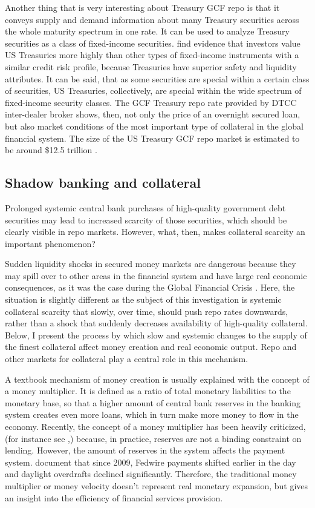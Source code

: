 \documentclass[11pt,a4paper,english,oneside]{article}
\begin{document}
Another thing that is very interesting about Treasury GCF repo is that it conveys supply and demand information about many Treasury securities across the whole maturity spectrum in one rate. It can be used to analyze Treasury securities as a class of fixed-income securities. \citet{krishnamurthy2012} find evidence that investors value US Treasuries more highly than other types of fixed-income instruments with a similar credit risk profile, because Treasuries have superior safety and liquidity attributes. It can be said, that as some securities are special within a certain class of securities, US Treasuries, collectively, are special within the wide spectrum of fixed-income security classes. The GCF Treasury repo rate provided by DTCC inter-dealer broker shows, then, not only the price of an overnight secured loan, but also market conditions of the most important type of collateral in the global financial system. The size of the US Treasury GCF repo market is estimated to be around \$12.5 trillion \citep{sifma2022}.

\subsection{Shadow banking and collateral}

Prolonged systemic central bank purchases of high-quality government debt securities may lead to increased scarcity of those securities, which should be clearly visible in repo markets. However, what, then, makes collateral scarcity an important phenomenon?

Sudden liquidity shocks in secured money markets are dangerous because they may spill over to other areas in the financial system and have large real economic consequences, as it was the case during the Global Financial Crisis \citep{gorton2009}. Here, the situation is slightly different as the subject of this investigation is systemic collateral scarcity that slowly, over time, should push repo rates downwards, rather than a shock that suddenly decreases availability of high-quality collateral. Below, I present the process by which slow and systemic changes to the supply of the finest collateral affect money creation and real economic output. Repo and other markets for collateral play a central role in this mechanism.

A textbook mechanism of money creation is usually explained with the concept of a money multiplier. It is defined as a ratio of total monetary liabilities to the monetary base, so that a higher amount of central bank reserves in the banking system creates even more loans, which in turn make more money to flow in the economy. Recently, the concept of a money multiplier has been heavily criticized, (for instance see \citet{boe2014},) because, in practice, reserves are not a binding constraint on lending. However, the amount of reserves in the system affects the payment system. \citet{badev2021} document that since 2009, Fedwire payments shifted earlier in the day and daylight overdrafts declined significantly. Therefore, the traditional money multiplier or money velocity doesn't represent real monetary expansion, but gives an insight into the efficiency of financial services provision.
\end{document}
